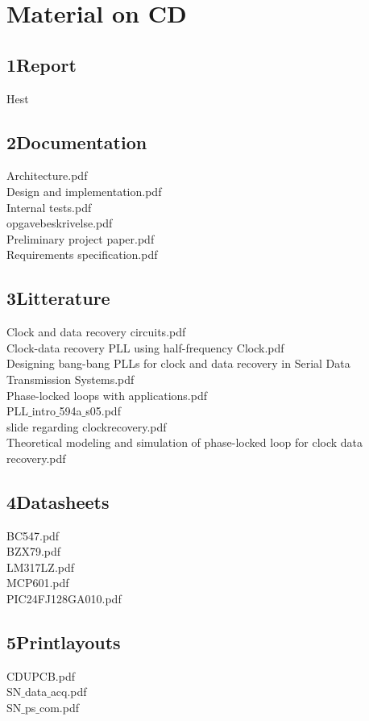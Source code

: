 \chapter{Material on CD}
\section{1Report}
Hest
\section{2Documentation}
Architecture.pdf\\
Design and implementation.pdf\\
Internal tests.pdf\\
opgavebeskrivelse.pdf\\
Preliminary project paper.pdf\\
Requirements specification.pdf\\
\section{3Litterature}
Clock and data recovery circuits.pdf\\
Clock-data recovery PLL using half-frequency Clock.pdf\\
Designing bang-bang PLLs for clock and data recovery in Serial Data Transmission Systems.pdf\\
Phase-locked loops with applications.pdf\\
PLL$\_$intro$\_$594a$\_$s05.pdf\\
slide regarding clockrecovery.pdf\\
Theoretical modeling and simulation of phase-locked loop for clock data recovery.pdf\\
\section{4Datasheets}
BC547.pdf\\
BZX79.pdf\\
LM317LZ.pdf\\
MCP601.pdf\\
PIC24FJ128GA010.pdf\\
\section{5Printlayouts}
CDUPCB.pdf\\
SN$\_$data$\_$acq.pdf\\
SN$\_$ps$\_$com.pdf
